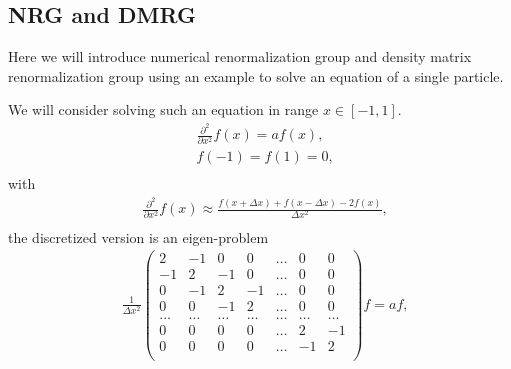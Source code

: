 \subsection{\label{NRGandDMRG}NRG and DMRG}

Here we will introduce numerical renormalization group and density matrix renormalization group using an example to solve an equation of a single particle.

We will consider solving such an equation in range $x\in [-1, 1]$.
\begin{equation}
\begin{split}
&\frac{\partial ^2 }{\partial x^2}f(x)=af(x),\\
&f(-1)=f(1)=0,\\
\end{split}
\end{equation}
with 
\begin{equation}
\begin{split}
&\frac{\partial ^2 }{\partial x^2}f(x)\approx \frac{f(x+\Delta x)+f(x-\Delta x)-2f(x)}{\Delta  x ^2},\\
\end{split}
\end{equation}
the discretized version is an eigen-problem
\begin{equation}
\begin{split}
&\frac{1}{\Delta x^2}\begin{pmatrix}
2 & -1 & 0 & 0 & \ldots & 0 & 0 \\
-1 & 2 & -1 & 0 & \ldots & 0 & 0 \\
0 & -1 & 2 & -1 & \ldots & 0 & 0 \\
0 & 0 & -1 & 2 & \ldots & 0 & 0 \\
\ldots & \ldots & \ldots & \ldots & \ldots & \ldots & \ldots \\
0 & 0 & 0 & 0 & \ldots & 2 & -1 \\
0 & 0 & 0 & 0 & \ldots & -1 & 2 \\
\end{pmatrix}f=a f,\\
\end{split}
\end{equation}

